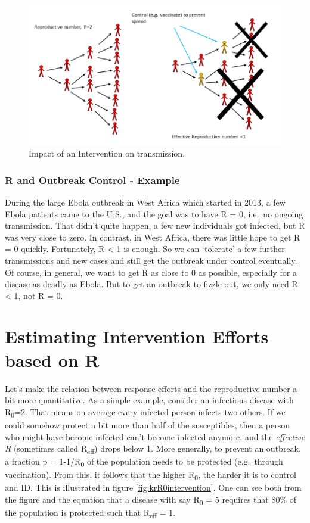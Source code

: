 \documentclass[]{book}
\theoremstyle{definition}
\theoremstyle{definition}
\theoremstyle{definition}
\theoremstyle{remark}
\begin{document}
\begin{figure}
\centering
\includegraphics{./images/R0intervention.png}
\caption{\label{fig:R0intervention}Impact of an Intervention on
transmission.}
\end{figure}

\hypertarget{myexamplebox}{%
\subsubsection{R and Outbreak Control - Example}\label{myexamplebox}}

During the large Ebola outbreak in West Africa which started in 2013, a
few Ebola patients came to the U.S., and the goal was to have R = 0,
i.e.~no ongoing transmission. That didn't quite happen, a few new
individuals got infected, but R was very close to zero. In contrast, in
West Africa, there was little hope to get R = 0 quickly. Fortunately, R
\textless{} 1 is enough. So we can `tolerate' a few further
transmissions and new cases and still get the outbreak under control
eventually. Of course, in general, we want to get R as close to 0 as
possible, especially for a disease as deadly as Ebola. But to get an
outbreak to fizzle out, we only need R \textless{} 1, not R = 0.

\hypertarget{estimating-intervention-efforts-based-on-r}{%
\section{Estimating Intervention Efforts based on
R}\label{estimating-intervention-efforts-based-on-r}}

Let's make the relation between response efforts and the reproductive
number a bit more quantitative. As a simple example, consider an
infectious disease with R\textsubscript{0}=2. That means on average
every infected person infects two others. If we could somehow protect a
bit more than half of the susceptibles, then a person who might have
become infected can't become infected anymore, and the \emph{effective
R} (sometimes called R\textsubscript{eff}) drops below 1. More
generally, to prevent an outbreak, a fraction p = 1-1/R\textsubscript{0}
of the population needs to be protected (e.g.~through vaccination). From
this, it follows that the higher R\textsubscript{0}, the harder it is to
control and ID. This is illustrated in figure
\ref{fig:krR0intervention}. One can see both from the figure and the
equation that a disease with say R\textsubscript{0} = 5 requires that
80\% of the population is protected such that R\textsubscript{eff} = 1.
\end{document}
